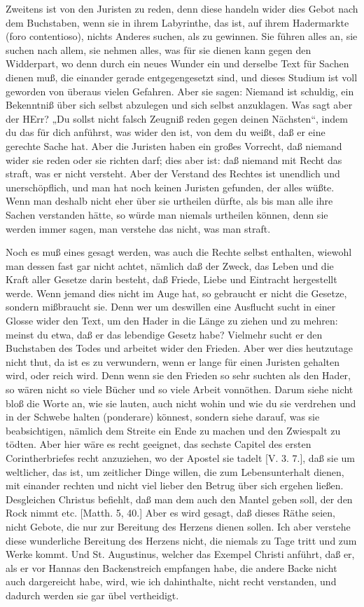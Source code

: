 Zweitens ist von den Juristen zu reden, denn diese handeln wider dies Gebot nach dem Buchstaben, wenn sie in ihrem Labyrinthe, das ist, auf ihrem Hadermarkte (foro contentioso), nichts Anderes suchen, als zu gewinnen. Sie führen alles an, sie suchen nach allem, sie nehmen alles, was für sie dienen kann gegen den Widderpart, wo denn durch ein neues Wunder ein und derselbe Text für Sachen dienen muß, die einander gerade entgegengesetzt sind, und dieses Studium ist voll geworden von überaus vielen Gefahren. Aber sie sagen: Niemand ist schuldig, ein Bekenntniß über sich selbst abzulegen und sich selbst anzuklagen. Was sagt aber der HErr? „Du sollst nicht falsch Zeugniß reden gegen deinen Nächsten“, indem du das für dich anführst, was wider den ist, von dem du weißt, daß er eine gerechte Sache hat. Aber die Juristen haben ein großes Vorrecht, daß niemand wider sie reden oder sie richten darf; dies aber ist: daß niemand mit Recht das straft, was er nicht versteht. Aber der Verstand des Rechtes ist unendlich und unerschöpflich, und man hat noch keinen Juristen gefunden, der alles wüßte. Wenn man deshalb nicht eher über sie urtheilen dürfte, als bis man alle ihre Sachen verstanden hätte, so würde man niemals urtheilen können, denn sie werden immer sagen, man verstehe das nicht, was man straft.

Noch es muß eines gesagt werden, was auch die Rechte selbst enthalten, wiewohl man dessen fast gar nicht achtet, nämlich daß der Zweck, das Leben und die Kraft aller Gesetze darin besteht, daß Friede, Liebe und Eintracht hergestellt werde. Wenn jemand dies nicht im Auge hat, so gebraucht er nicht die Gesetze, sondern mißbraucht sie. Denn wer um deswillen eine Ausflucht sucht in einer Glosse wider den Text, um den Hader in die Länge zu ziehen und zu mehren: meinst du etwa, daß er das lebendige Gesetz habe? Vielmehr sucht er den Buchstaben des Todes und arbeitet wider den Frieden. Aber wer dies heutzutage nicht thut, da ist es zu verwundern, wenn er lange für einen Juristen gehalten wird, oder reich wird. Denn wenn sie den Frieden so sehr suchten als den Hader, so wären nicht so viele Bücher und so viele Arbeit vonnöthen. Darum siehe nicht bloß die Worte an, wie sie
lauten, auch nicht wohin und wie du sie verdrehen und in der Schwebe halten (ponderare) könnest, sondern siehe darauf, was sie beabsichtigen, nämlich dem Streite ein Ende zu machen und den Zwiespalt zu tödten. Aber hier wäre es recht geeignet, das sechste Capitel des ersten Corintherbriefes recht anzuziehen, wo der Apostel sie tadelt [V. 3. 7.], daß sie um weltlicher, das ist, um zeitlicher Dinge willen, die zum Lebensunterhalt dienen, mit einander rechten und nicht viel lieber den Betrug über sich ergehen ließen. Desgleichen Christus befiehlt, daß man dem auch den Mantel geben soll, der den Rock nimmt etc. [Matth. 5, 40.] Aber es wird gesagt, daß dieses Räthe seien, nicht Gebote, die nur zur Bereitung des Herzens dienen sollen. Ich aber verstehe diese wunderliche Bereitung des Herzens nicht, die niemals zu Tage tritt und zum Werke kommt. Und St. Augustinus, welcher das Exempel Christi anführt, daß er, als er vor Hannas den Backenstreich empfangen habe, die andere Backe nicht auch dargereicht habe, wird, wie ich dahinthalte, nicht recht verstanden, und dadurch werden sie gar übel vertheidigt.

